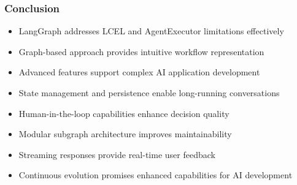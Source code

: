 \begin{frame}[fragile]\frametitle{Conclusion}
      \begin{itemize}
        \item LangGraph addresses LCEL and AgentExecutor limitations effectively
        \item Graph-based approach provides intuitive workflow representation
        \item Advanced features support complex AI application development
        \item State management and persistence enable long-running conversations
        \item Human-in-the-loop capabilities enhance decision quality
        \item Modular subgraph architecture improves maintainability
        \item Streaming responses provide real-time user feedback
        \item Continuous evolution promises enhanced capabilities for AI development
      \end{itemize}
\end{frame}
